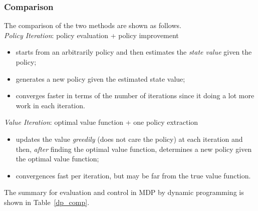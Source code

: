 \documentclass{progartcn}
\begin{document}
	\subsubsection{Comparison}
			The comparison of the two methods are shown as follows.\\

			\textit{Policy Iteration}: policy evaluation + policy improvement
			\begin{itemize}[noitemsep,topsep=0pt]
			\item starts from an arbitrarily policy and then estimates the \textit{state value} given the policy;
			\item generates a new policy given the estimated state value;
			\item converges faster in terms of the number of iterations since it doing a lot more work in each iteration.\\
	 		\end{itemize}

			\textit{Value Iteration}: optimal value function + one policy extraction
			\begin{itemize}[noitemsep,topsep=0pt]
				\item updates the value \textit{greedily} (does not care the policy) at each iteration and then, \textit{after} finding the optimal value function, determines a new policy given the optimal value function;
	  			\item convergences fast per iteration, but may be far from the true value function.\\
			\end{itemize}

			The summary for evaluation and control in MDP by dynamic programming is shown in Table~\ref{dp_comp}.
		
\end{document}
